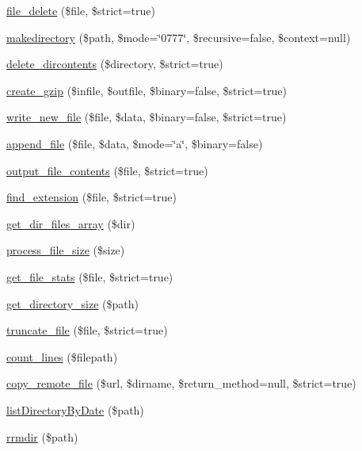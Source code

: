 \begin{DoxyCompactItemize}
\hyperlink{class_files_a5c75ce3bef85b8f80b5fb1cab1adb74e}{file\-\_\-delete} (\$file, \$strict=true)
\item 
\hyperlink{class_files_a20c948d332a2b62b3034057bf0378e1c}{makedirectory} (\$path, \$mode=\char`\"{}0777\char`\"{}, \$recursive=false, \$context=null)
\item 
\hyperlink{class_files_a7adf34c81569b20f6c1d519aae8d3e3a}{delete\-\_\-dircontents} (\$directory, \$strict=true)
\item 
\hyperlink{class_files_ac4ed0d6da3bb43e2318db1cc2b89f2c8}{create\-\_\-gzip} (\$infile, \$outfile, \$binary=false, \$strict=true)
\item 
\hyperlink{class_files_a5e3b84ff275d2b6734ebf8a54185e826}{write\-\_\-new\-\_\-file} (\$file, \$data, \$binary=false, \$strict=true)
\item 
\hyperlink{class_files_a3517ed9d2d1e629c78466b1506a77ee3}{append\-\_\-file} (\$file, \$data, \$mode=\char`\"{}a\char`\"{}, \$binary=false)
\item 
\hyperlink{class_files_a8972483d65d7765f4d29056eb67e5fed}{output\-\_\-file\-\_\-contents} (\$file, \$strict=true)
\item 
\hyperlink{class_files_a38a434ec020e56cb27fc8f8f57e8de10}{find\-\_\-extension} (\$file, \$strict=true)
\item 
\hyperlink{class_files_acadbd94e60dcb4bdeb54add445447703}{get\-\_\-dir\-\_\-files\-\_\-array} (\$dir)
\item 
\hyperlink{class_files_a4cb83eb84ebfcfa560cdea7817d7e6f4}{process\-\_\-file\-\_\-size} (\$size)
\item 
\hyperlink{class_files_a247859f95e43b6147d06fef867e536ae}{get\-\_\-file\-\_\-stats} (\$file, \$strict=true)
\item 
\hyperlink{class_files_ab31492186c42f455b28098ae96eafa9d}{get\-\_\-directory\-\_\-size} (\$path)
\item 
\hyperlink{class_files_a977ddd0bab2c2480fa67dd5757cb3e70}{truncate\-\_\-file} (\$file, \$strict=true)
\item 
\hyperlink{class_files_aaa776e1a87ac9719bcd2e3dcbcd77b78}{count\-\_\-lines} (\$filepath)
\item 
\hyperlink{class_files_af7d3806a8ea348bbc3d62910cc4367f2}{copy\-\_\-remote\-\_\-file} (\$url, \$dirname, \$return\-\_\-method=null, \$strict=true)
\item 
\hyperlink{class_files_a827216a16a49bdb08a2371ed47da498f}{list\-Directory\-By\-Date} (\$path)
\item 
\hyperlink{class_files_ab5895b75a3b2abdddf1cb351a8c6b58b}{rrmdir} (\$path)

\end{DoxyCompactItemize}
